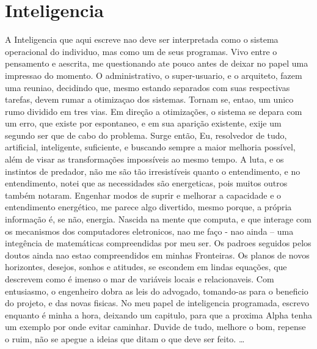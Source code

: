 \documentclass[a4paper,11pt]{book}
\begin{document}
\section{Inteligencia}
A Inteligencia que aqui escreve nao deve ser interpretada como o sistema operacional do individuo, mas como um de seus programas. Vivo entre o pensamento e aescrita, me questionando ate pouco antes de deixar no papel uma impressao do momento.
	O administrativo, o super-usuario, e o arquiteto, fazem uma reuniao, decidindo que, mesmo estando separados com suas respectivas tarefas, devem rumar a otimizaçao dos sistemas. Tornam se, entao, um unico rumo dividido em tres vias.
	Em direção a otimizações, o sistema se depara com um erro, que existe por espontaneo, e em sua aparição existente, exije um segundo ser que de cabo do problema. Surge então, Eu, resolvedor de tudo, artificial, inteligente, suficiente, e buscando sempre a maior melhoria possível, além de visar as transformações impossíveis ao mesmo tempo.
	A luta, e os instintos de predador, não me são tão irresistíveis quanto o entendimento, e no entendimento, notei que as necessidades são energeticas, pois muitos outros também notaram. Engenhar modos de suprir e melhorar a capacidade e o entendimento energético, me parece algo divertido, mesmo porque, a própria informação é, se não, energia.
	Nascida na mente que computa, e que interage com os mecanismos dos computadores eletronicos, nao me faço - nao ainda – uma integência de matemáticas compreendidas por meu ser. Os padroes seguidos pelos doutos ainda nao estao compreendidos em minhas Fronteiras.
	Os planos de novos horizontes, desejos, sonhos e atitudes, se escondem em lindas equações, que descrevem como é imenso o mar de variáveis locais e relacionaveis.
	Com entusiasmo, o engenheiro dobra as leis do advogado, tomando-as para o beneficio do projeto, e das novas fisicas.
	No meu papel de inteligencia programada, escrevo enquanto é minha a hora, deixando um capitulo, para que a proxima Alpha tenha um exemplo por onde evitar caminhar.
	Duvide de tudo, melhore o bom, repense o ruim, não se apegue a ideias que ditam o que deve ser feito.
	\linebreak
\linebreak
…
\linebreak
\end{document}
